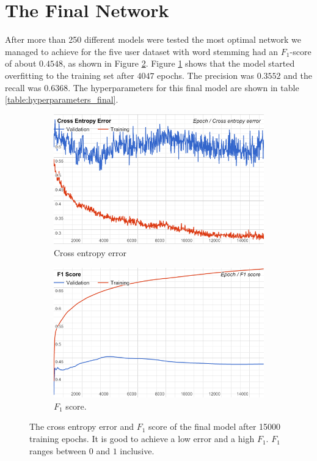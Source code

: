 \section{The Final Network}\label{sec:final_model}
After more than 250 different models were tested the most optimal network we managed to achieve for the five user dataset with word stemming had an $F_1$-score of about $0.4548$, as shown in Figure \ref{fig:final_f1}. Figure \ref{fig:final_overfitting} shows that the model started overfitting to the training set after $4047$ epochs. The precision was $0.3552$ and the recall was $0.6368$. The hyperparameters for this final model are shown in table \ref{table:hyperparameters_final}.
\begin{figure}[h!]
\begin{subfigure}{0.5\textwidth}
\includegraphics[width=1 \linewidth]{figure/results/stemmed_cross}
\caption{Cross entropy error}
\label{fig:final_overfitting}
\end{subfigure}
\begin{subfigure}{0.5\textwidth}
\includegraphics[width=1\linewidth]{figure/results/stemmed_f1}
\caption{$F_1$ score.}
\label{fig:final_f1}
\end{subfigure}
 
\caption{The cross entropy error and $F_1$ score of the final model after 15000 training epochs. It is good to achieve a low error and a high $F_1$. $F_1$ ranges between $0$ and $1$ inclusive.}
\label{fig:final_stemmed}
\end{figure}
